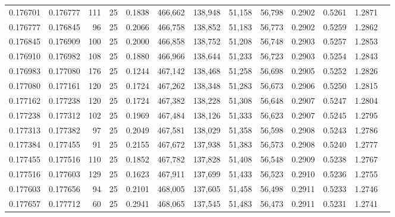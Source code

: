 \begin{tabular}{rrrrrrrrrrrrr}
0.176701 & 0.176777 &   111 &  25 &                                     0.1838 & 466,662 & 138,948 &  51,158 &  56,798 & 0.2902 & 0.5261 & 1.2871 \\
0.176777 & 0.176845 &    96 &  25 &                                     0.2066 & 466,758 & 138,852 &  51,183 &  56,773 & 0.2902 & 0.5259 & 1.2862 \\
0.176845 & 0.176909 &   100 &  25 &                                     0.2000 & 466,858 & 138,752 &  51,208 &  56,748 & 0.2903 & 0.5257 & 1.2853 \\
0.176910 & 0.176982 &   108 &  25 &                                     0.1880 & 466,966 & 138,644 &  51,233 &  56,723 & 0.2903 & 0.5254 & 1.2843 \\
0.176983 & 0.177080 &   176 &  25 &                                     0.1244 & 467,142 & 138,468 &  51,258 &  56,698 & 0.2905 & 0.5252 & 1.2826 \\
0.177080 & 0.177161 &   120 &  25 &                                     0.1724 & 467,262 & 138,348 &  51,283 &  56,673 & 0.2906 & 0.5250 & 1.2815 \\
0.177162 & 0.177238 &   120 &  25 &                                     0.1724 & 467,382 & 138,228 &  51,308 &  56,648 & 0.2907 & 0.5247 & 1.2804 \\
0.177238 & 0.177312 &   102 &  25 &                                     0.1969 & 467,484 & 138,126 &  51,333 &  56,623 & 0.2907 & 0.5245 & 1.2795 \\
0.177313 & 0.177382 &    97 &  25 &                                     0.2049 & 467,581 & 138,029 &  51,358 &  56,598 & 0.2908 & 0.5243 & 1.2786 \\
0.177384 & 0.177455 &    91 &  25 &                                     0.2155 & 467,672 & 137,938 &  51,383 &  56,573 & 0.2908 & 0.5240 & 1.2777 \\
0.177455 & 0.177516 &   110 &  25 &                                     0.1852 & 467,782 & 137,828 &  51,408 &  56,548 & 0.2909 & 0.5238 & 1.2767 \\
0.177516 & 0.177603 &   129 &  25 &                                     0.1623 & 467,911 & 137,699 &  51,433 &  56,523 & 0.2910 & 0.5236 & 1.2755 \\
0.177603 & 0.177656 &    94 &  25 &                                     0.2101 & 468,005 & 137,605 &  51,458 &  56,498 & 0.2911 & 0.5233 & 1.2746 \\
0.177657 & 0.177712 &    60 &  25 &                                     0.2941 & 468,065 & 137,545 &  51,483 &  56,473 & 0.2911 & 0.5231 & 1.2741 \\

\end{tabular}
